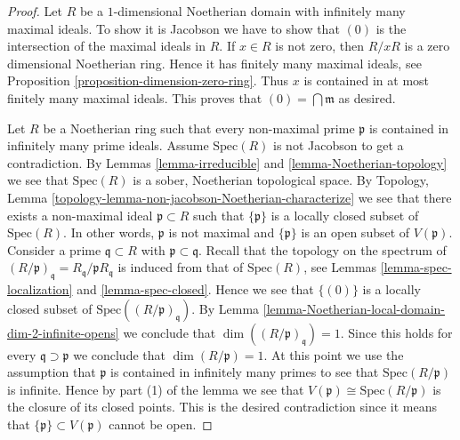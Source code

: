 \begin{proof}
Let $R$ be a $1$-dimensional Noetherian domain with
infinitely many maximal ideals. To show it is Jacobson
we have to show that $(0)$ is the intersection of
the maximal ideals in $R$.
If $x \in R$ is not zero, then $R/xR$ is
a zero dimensional Noetherian ring.
Hence it has finitely many
maximal ideals, see Proposition \ref{proposition-dimension-zero-ring}. Thus
$x$ is contained in at most finitely many maximal ideals.
This proves that $(0) = \bigcap \mathfrak m$ as desired.

\medskip\noindent
Let $R$ be a Noetherian ring such that
every non-maximal prime $\mathfrak p$ is contained
in infinitely many prime ideals.
Assume $\text{Spec}(R)$ is not Jacobson to get
a contradiction.
By Lemmas \ref{lemma-irreducible}
and \ref{lemma-Noetherian-topology}
we see that $\text{Spec}(R)$ is a sober, Noetherian topological space.
By Topology, Lemma \ref{topology-lemma-non-jacobson-Noetherian-characterize}
we see that there exists a non-maximal ideal $\mathfrak p \subset R$
such that $\{\mathfrak p\}$ is a locally closed subset of
$\text{Spec}(R)$. In other words, $\mathfrak p$ is not maximal
and $\{\mathfrak p\}$ is an open subset of $V(\mathfrak p)$.
Consider a prime $\mathfrak q \subset R$ with
$\mathfrak p \subset \mathfrak q$. Recall that the topology on the spectrum of
$(R/\mathfrak p)_{\mathfrak q} = R_{\mathfrak q}/\mathfrak pR_{\mathfrak q}$
is induced from that of $\text{Spec}(R)$, see Lemmas
\ref{lemma-spec-localization} and \ref{lemma-spec-closed}.
Hence we see that $\{(0)\}$ is a locally closed subset of
$\text{Spec}((R/\mathfrak p)_{\mathfrak q})$. By
Lemma \ref{lemma-Noetherian-local-domain-dim-2-infinite-opens}
we conclude that $\dim((R/\mathfrak p)_{\mathfrak q}) = 1$.
Since this holds for every $\mathfrak q \supset \mathfrak p$
we conclude that $\dim(R/\mathfrak p) = 1$. At this point we use
the assumption that $\mathfrak p$ is contained in infinitely many
primes to see that $\text{Spec}(R/\mathfrak p)$ is infinite.
Hence by part (1) of the lemma we see that
$V(\mathfrak p) \cong \text{Spec}(R/\mathfrak p)$
is the closure of its closed points.
This is the desired contradiction since it means that
$\{\mathfrak p\} \subset V(\mathfrak p)$ cannot be open.
\end{proof}




















